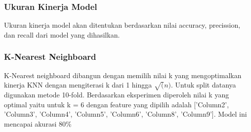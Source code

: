 \documentclass[11pt]{article}
\begin{document}
    \subsubsection{Ukuran Kinerja Model}\label{ukuran-kinerja-model}

    Ukuran kinerja model akan ditentukan berdasarkan nilai accuracy,
precission, dan recall dari model yang dihasilkan.

    \subsubsection{K-Nearest Neighboard}\label{k-nearest-neighboard}

    K-Nearest neighboard dibangun dengan memilih nilai k yang mengoptimalkan
kinerja KNN dengan mengiterasi k dari 1 hingga \(\sqrt(n)\). Untuk split
datanya digunakan metode 10-fold. Berdasarkan eksperimen diperoleh nilai
k yang optimal yaitu untuk k = 6 dengan feature yang dipilih adalah
{[}'Column2', 'Column3', 'Column4', 'Column5', 'Column6', 'Column8',
'Column9'{]}. Model ini mencapai akurasi 80\%
\end{document}
